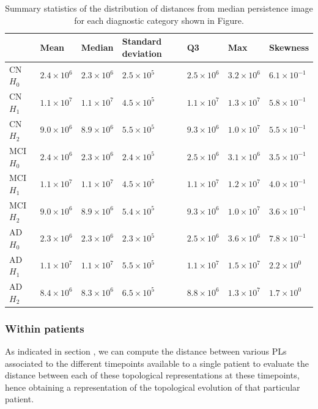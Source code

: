 \documentclass{article}
\begin{document}
\begin{table}
\centering
\begin{tabular}{lllllll}
\toprule
{} &               Mean &             Median & Standard deviation & Q3 &                Max &            Skewness \\
\midrule
CN $H_0$  &  $2.4\times10^{6}$ &  $2.3\times10^{6}$ & $2.5\times10^{5}$ &  $2.5\times10^{6}$ &  $3.2\times10^{6}$ & $6.1\times10^{-1}$ \\
CN $H_1$  &  $1.1\times10^{7}$ &  $1.1\times10^{7}$ & $4.5\times10^{5}$ &  $1.1\times10^{7}$ &  $1.3\times10^{7}$ & $5.8\times10^{-1}$ \\
CN $H_2$  &  $9.0\times10^{6}$ &  $8.9\times10^{6}$ & $5.5\times10^{5}$ &  $9.3\times10^{6}$ &  $1.0\times10^{7}$ & $5.5\times10^{-1}$ \\
MCI $H_0$ &  $2.4\times10^{6}$ &  $2.3\times10^{6}$ & $2.4\times10^{5}$ &  $2.5\times10^{6}$ &  $3.1\times10^{6}$ & $3.5\times10^{-1}$ \\
MCI $H_1$ &  $1.1\times10^{7}$ &  $1.1\times10^{7}$ & $4.5\times10^{5}$ &  $1.1\times10^{7}$ &  $1.2\times10^{7}$ & $4.0\times10^{-1}$ \\
MCI $H_2$ &  $9.0\times10^{6}$ &  $8.9\times10^{6}$ & $5.4\times10^{5}$ &  $9.3\times10^{6}$ &  $1.0\times10^{7}$ & $3.6\times10^{-1}$ \\
AD $H_0$  &  $2.3\times10^{6}$ &  $2.3\times10^{6}$ & $2.3\times10^{5}$ &  $2.5\times10^{6}$ &  $3.6\times10^{6}$ & $7.8\times10^{-1}$ \\
AD $H_1$  &  $1.1\times10^{7}$ &  $1.1\times10^{7}$ & $5.5\times10^{5}$ &  $1.1\times10^{7}$ &  $1.5\times10^{7}$ & $2.2\times10^{0}$ \\
AD $H_2$  &  $8.4\times10^{6}$ &  $8.3\times10^{6}$ & $6.5\times10^{5}$ &  $8.8\times10^{6}$ &  $1.3\times10^{7}$ & $1.7\times10^{0}$ \\
\bottomrule
\end{tabular}
\caption{Summary statistics of the distribution of distances from median persistence image for each diagnostic category shown in Figure.}
\label{tab:stats_median_pi}
\end{table}



\subsubsection{Within patients}

As indicated in section \label{sec:tda_setup}, we can compute the distance between various PLs associated to the different timepoints available to a single patient to evaluate the distance between each of these topological representations at these timepoints, hence obtaining a representation of the topological evolution of that particular patient.
\end{document}
